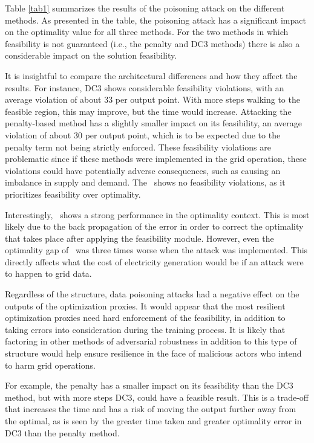 Table \ref{tab1} summarizes the results of the poisoning attack on the different methods. As presented in the table, the poisoning attack has a significant impact on the optimality value for all three methods. For the two methods in which feasibility is not guaranteed (i.e., the penalty and DC3 methods) there is also a considerable impact on the solution feasibility.

It is insightful to compare the architectural differences and how they affect the results. For instance, DC3 shows considerable feasibility violations, with an average violation of about 33 per output point. With more steps walking to the feasible region, this may improve, but the time would increase.  Attacking the penalty-based method has a slightly smaller impact on its feasibility, an average violation of about 30 per output point, which is to be expected due to the penalty term not being strictly enforced. These feasibility violations are problematic since if these methods were implemented in the grid operation, these violations could have potentially adverse consequences, such as causing an imbalance in supply and demand. The \LOOPLC~shows no feasibility violations, as it prioritizes feasibility over optimality. 

Interestingly, \LOOPLC~shows a strong performance in the optimality context. This is most likely due to the back propagation of the error in order to correct the optimality that takes place after applying the feasibility module. However, even the optimality gap of \LOOPLC~was three times worse when the attack was implemented. This directly affects what the cost of electricity generation would be if an attack were to happen to grid data.



Regardless of the structure, data poisoning attacks had a negative effect on the outputs of the optimization proxies. It would appear that the most resilient optimization proxies need hard enforcement of the feasibility, in addition to taking errors into consideration during the training process. It is likely that factoring in other methods of adversarial robustness in addition to this type of structure would help ensure resilience in the face of malicious actors who intend to harm grid operations.

For example, the penalty has a smaller impact on its feasibility than the DC3 method, but with more steps DC3, could have a feasible result. This is a trade-off that increases the time and has a risk of moving the output further away from the optimal, as is seen by the greater time taken and greater optimality error in DC3 than the penalty method.




